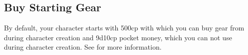 \begin{multicols}{2}
\section{Buy Starting Gear}
By default, your character starts with 500cp with which you can buy gear from during character creation and 9d10cp pocket money, which you can not use during character creation.
See  for more information.

\end{multicols}
